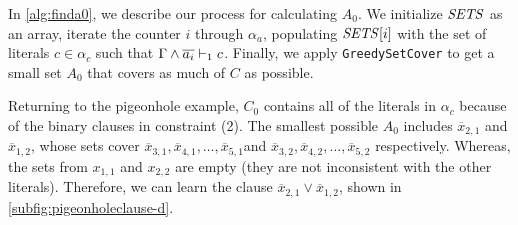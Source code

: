 In \autoref{alg:finda0}, we describe our process for calculating $A_0$. 
We initialize ${\it SETS}$ as an array, iterate the counter
$i$ through $\alpha_a$, populating ${\it SETS}[i]$ with the set of literals
$c \in \alpha_c$ such that $\Gamma \land \overline{a_i} \vdash_1 c$. Finally, we apply
\texttt{GreedySetCover} to get a small set $A_0$ that covers as much of $C$ as possible.

Returning to the pigeonhole example, 
$C_0$ contains all of the literals in $\alpha_c$ because of the binary clauses in constraint (2). 
The smallest possible $A_0$ includes $\overline{x}_{2, 1}$ and $\overline{x}_{1, 2}$, whose 
sets cover $\overline{x}_{3, 1}, \overline{x}_{4, 1},  \ldots, \overline{x}_{5,
1}$and  $\overline{x}_{3, 2}, \overline{x}_{4, 2},  \ldots, \overline{x}_{5,
2}$ respectively. 
Whereas, the sets from $x_{1, 1}$ and $x_{2, 2}$ are empty (they are not inconsistent with the other literals).
Therefore, we can learn the clause $\overline{x}_{2, 1} \lor \overline{x}_{1, 2}$, shown in 
\autoref{subfig:pigeonholeclause-d}.





